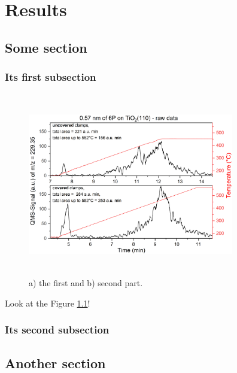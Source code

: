 \chapter{Results} 

\lipsum[68]

\section{Some section}

\lipsum[69]

\subsection{Its first subsection}

\begin{figure} [!h]
	\centering
	\includegraphics[width=9cm,height=8cm,keepaspectratio]{figures/results/some-graph.png}
	\setlength\belowcaptionskip{3pt}
	\caption{a) the first and b) second part.}
	\label{some-graph}
\end{figure}

Look at the Figure \ref{some-graph}!

\lipsum[70]


\subsection{Its second subsection}
\lipsum[77]



\section{Another section}

\lipsum[78]

